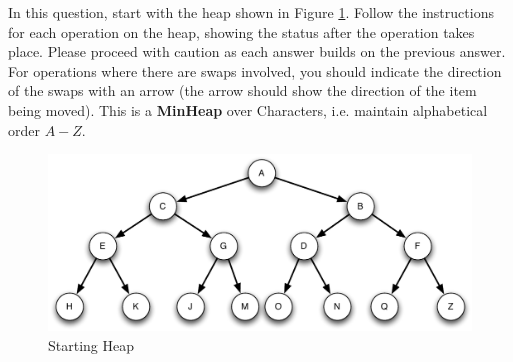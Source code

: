 \documentclass[11pt]{exam}
\begin{document}
\begin{questions}

\newpage
\question In this question, start with the heap shown in Figure \ref{fig:heap01}.   Follow the instructions for each operation on the heap, showing the status after the operation takes place.   Please proceed with caution as each answer builds on the previous answer.   For operations where there are swaps involved, you should indicate the direction of the swaps with an arrow (the arrow should show the direction of the item being moved).   This is a {\bf MinHeap} over Characters, i.e. maintain alphabetical order $A-Z$.

\begin{figure}[htbp]
   \begin{centering}
      \includegraphics[width=6in]{heap_remove_question_01}
   \end{centering}
   \caption{Starting Heap}
   \label{fig:heap01}
\end{figure}

\end{questions}
\end{document}
